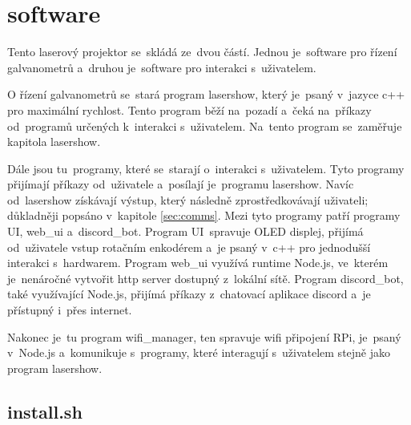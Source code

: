 \chapter{software}
Tento laserový projektor se~skládá ze~dvou částí. Jednou je~software pro řízení galvanometrů a~druhou je~software pro interakci s~uživatelem.

O řízení galvanometrů se~stará program lasershow, který je~psaný v~jazyce c++ pro maximální rychlost. Tento program běží na~pozadí a~čeká na~příkazy od~programů určených k~interakci s~uživatelem. Na~tento program se~zaměřuje kapitola lasershow. 

Dále jsou tu~programy, které se~starají o~interakci s~uživatelem. Tyto programy přijímají příkazy od~uživatele a~posílají je~programu lasershow. Navíc od~lasershow získávají výstup, který následně zprostředkovávají uživateli; důkladněji popsáno v~kapitole \ref{sec:comms}.
Mezi tyto programy patří programy UI, web\_ui a~discord\_bot. Program UI~spravuje OLED displej, přijímá od~uživatele vstup rotačním enkodérem a~je psaný v~c++ pro jednodušší interakci s~hardwarem. Program web\_ui využívá runtime Node.js, ve~kterém je~nenáročné vytvořit http server dostupný z~lokální sítě.  Program discord\_bot, také využívající Node.js, přijímá příkazy z~chatovací aplikace discord a~je přístupný i~přes internet.

Nakonec je~tu program wifi\_manager, ten spravuje wifi připojení RPi, je~psaný v~Node.js a~komunikuje s~programy, které interagují s~uživatelem stejně jako program lasershow.

\section{install.sh}





